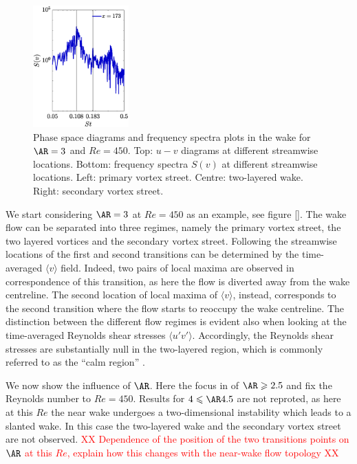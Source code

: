 \begin{figure}
\includegraphics[width=0.328\textwidth]{./fig/appendix/Spec_AR3_Re450_c.eps}
\caption{Phase space diagrams and frequency spectra plots in the wake for $\AR=3$ and $Re=450$. Top: $u-v$ diagrams at different streamwise locations. Bottom: frequency spectra $S(v)$ at different streamwise locations. Left: primary vortex street. Centre: two-layered wake. Right: secondary vortex street.}
\label{fig:wakeb}
\end{figure}

We start considering $\AR=3$ at $Re=450$ as an example, see figure \ref{}. The wake flow can be separated into three regimes, namely the primary vortex street, the two layered vortices and the secondary vortex street. Following \cite{jiang-cheng-2019} the streamwise locations of the first and second transitions can be determined by the time-averaged $\langle v \rangle$ field. Indeed, two pairs of local maxima are observed in correspondence of this transition, as here the flow is diverted away from the wake centreline. The second location of local maxima of $\langle v \rangle$, instead, corresponds to the second transition where the flow starts to reoccupy the wake centreline. The distinction between the different flow regimes is evident also when looking at the time-averaged Reynolds shear stresses $\langle u'v' \rangle$. Accordingly, the Reynolds shear stresses are substantially null in the two-layered region, which is commonly referred to as the ``calm region'' \citep{durgin-karlsson-1971}.

We now show the influence of $\AR$. Here the focus in of $\AR \ge 2.5$ and fix the Reynolds number to $Re=450$. Results for $4 \le \AR 4.5$ are not reproted, as here at this $Re$ the near wake undergoes a two-dimensional instability which leads to a slanted wake. In this case the two-layered wake and the secondary vortex street are not observed. \textcolor{red}{XX Dependence of the position of the two transitions points on $\AR$ at this $Re$, explain how this changes with the near-wake flow topology XX}


